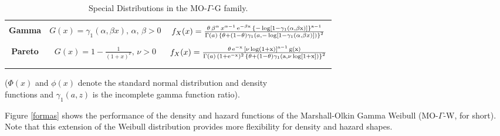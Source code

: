 \documentclass[12pt,a4paper]{article} %
\begin{document}
\begin{landscape}
\begin{table}[htbp]
\begin{tabular}{c|c|c}
\hline
{} & {} & {} \\
\textbf{Gamma} &  $G(x)=\gamma_1(\alpha,\beta x),\,\alpha,\,\beta>0$ & $f_{X}(x)=\frac{\theta\,\beta^{\alpha}\,x^{\alpha-1}\,\rm{e}^{-\beta x}\,\left\{ -\log[1-\gamma_1(\alpha,\beta x)] \right\}^{a-1}}{\Gamma(a)\,\left\{\theta+(1-\theta)\gamma_1\left( a, -\log \left[1-\gamma_1(\alpha,\beta x)\right]\right)\right\}^{2}}$ \\
{} & {} & {} \\                                                                                                                                                                                                                                                                           \hline
\textbf{Pareto} &  $G(x)=1-\frac{1}{(1+x)^\nu},\,\nu>0$ & $f_{X}(x)=\frac{\theta \, \rm{e}^{-x}\, \left[\nu\log(1+x)\right]^{a-1}\, g(x)}{\Gamma(a)\,(1+\rm{e}^{-x})^2\,\left\{\theta+(1-\theta)\gamma_1\left( a, \nu\log[1+x]\right)\right\}^{2}}$\\
{} & {} & {} \\
\hline
{} & {} & {} \\
\hline
\end{tabular}
\caption{Special Distributions in the  MO-$\Gamma$-G family.}
($\Phi(x)$ and $\phi(x)$ denote the standard normal distribution and density\\ functions and $\gamma_1(a,z)$ is the incomplete gamma function ratio).
\end{table}
\end{landscape}


Figure \ref{formas} shows the performance of the density and hazard functions of the Marshall-Olkin Gamma Weibull (MO-$\Gamma$-W, for short). Note that this extension of the Weibull distribution provides more flexibility for density and hazard shapes.
\end{document}

